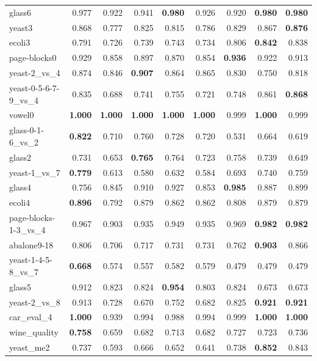 {\begin{table}[hbp]
{\begin{tabular}{lrrrrrrrr}
	glass6 & 0.977 & 0.922 & 0.941 & \textbf{0.980} & 0.926 & 0.920 & \textbf{0.980} & \textbf{0.980} \\
	yeast3 & 0.868 & 0.777 & 0.825 & 0.815 & 0.786 & 0.829 & 0.867 & \textbf{0.876} \\
	ecoli3 & 0.791 & 0.726 & 0.739 & 0.743 & 0.734 & 0.806 & \textbf{0.842} & 0.838 \\
	page-blocks0 & 0.929 & 0.858 & 0.897 & 0.870 & 0.854 & \textbf{0.936} & 0.922 & 0.913 \\
	yeast-2\_vs\_4 & 0.874 & 0.846 & \textbf{0.907} & 0.864 & 0.865 & 0.830 & 0.750 & 0.818 \\
	yeast-0-5-6-7-9\_vs\_4 & 0.835 & 0.688 & 0.741 & 0.755 & 0.721 & 0.748 & 0.861 & \textbf{0.868} \\
	vowel0 & \textbf{1.000} & \textbf{1.000} & \textbf{1.000} & \textbf{1.000} & \textbf{1.000} & 0.999 & \textbf{1.000} & 0.999 \\
	glass-0-1-6\_vs\_2 & \textbf{0.822} & 0.710 & 0.760 & 0.728 & 0.720 & 0.531 & 0.664 & 0.619 \\
	glass2 & 0.731 & 0.653 & \textbf{0.765} & 0.764 & 0.723 & 0.758 & 0.739 & 0.649 \\
	yeast-1\_vs\_7 & \textbf{0.779} & 0.613 & 0.580 & 0.632 & 0.584 & 0.693 & 0.740 & 0.759 \\
	glass4 & 0.756 & 0.845 & 0.910 & 0.927 & 0.853 & \textbf{0.985} & 0.887 & 0.899 \\
	ecoli4 & \textbf{0.896} & 0.792 & 0.879 & 0.862 & 0.862 & 0.808 & 0.879 & 0.879 \\
	page-blocks-1-3\_vs\_4 & 0.967 & 0.903 & 0.935 & 0.949 & 0.935 & 0.969 & \textbf{0.982} & \textbf{0.982} \\
	abalone9-18 & 0.806 & 0.706 & 0.717 & 0.731 & 0.731 & 0.762 & \textbf{0.903} & 0.866 \\
	yeast-1-4-5-8\_vs\_7 & \textbf{0.668} & 0.574 & 0.557 & 0.582 & 0.579 & 0.479 & 0.479 & 0.479 \\
	glass5 & 0.912 & 0.823 & 0.824 & \textbf{0.954} & 0.803 & 0.824 & 0.673 & 0.673 \\
	yeast-2\_vs\_8 & 0.913 & 0.728 & 0.670 & 0.752 & 0.682 & 0.825 & \textbf{0.921} & \textbf{0.921} \\
	car\_eval\_4 & \textbf{1.000} & 0.939 & 0.994 & 0.988 & 0.994 & 0.999 & \textbf{1.000} & \textbf{1.000} \\
	wine\_quality & \textbf{0.758} & 0.659 & 0.682 & 0.713 & 0.682 & 0.727 & 0.723 & 0.736 \\
	yeast\_me2 & 0.737 & 0.593 & 0.666 & 0.652 & 0.641 & 0.738 & \textbf{0.852} & 0.843 \\

\end{tabular}}
\end{table}}
